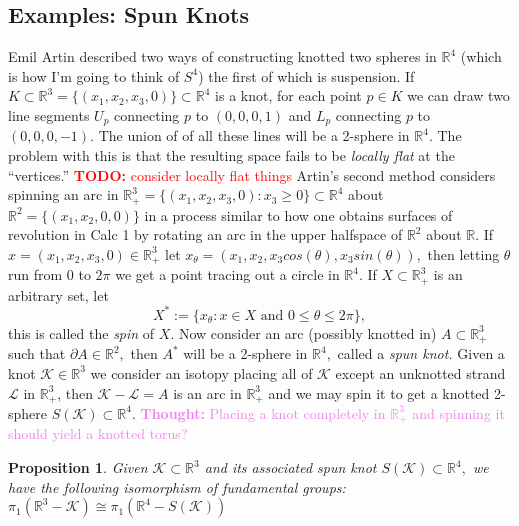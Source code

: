 \documentclass{amsart}
\def\todo#1{\textcolor{red}{\textbf{TODO: }{#1}}}
\def\thought#1{\textcolor{violet}{\textbf{Thought: }{#1}}}
\newtheorem{proposition}[theorem]{Proposition}
\theoremstyle{definition}
\begin{document}
\subsection{Examples: Spun Knots}
Emil Artin described two ways of constructing knotted two spheres in $\mathbb{R}^{4}$ (which is how I'm going to think of $S^{4}$) the first of which is suspension. If $K \subset \mathbb{R}^{3} = \{(x_{1}, x_{2}, x_{3}, 0)\}\subset \mathbb{R}^{4}$ is a knot, for each point $p \in K$ we can draw two line segments $U_{p}$ connecting $p$ to $(0, 0, 0, 1)$ and $L_{p}$ connecting $p$ to $(0, 0, 0, -1).$ The union of of all these lines will be a 2-sphere in $\mathbb{R}^{4}.$ The problem with this is that the resulting space fails to be \textit{locally flat} at the ``vertices.'' \todo{consider locally flat things} \newline \newline Artin's second method considers spinning an arc in $\mathbb{R}^{3}_{+} = \{(x_{1}, x_{2}, x_{3}, 0) : x_{3} \geq 0\} \subset \mathbb{R}^{4}$ about $\mathbb{R}^{2} = \{(x_{1}, x_{2}, 0, 0)\}$ in a process similar to how one obtains surfaces of revolution in Calc 1 by rotating an arc in the upper halfspace of $\mathbb{R}^{2}$ about $\mathbb{R}$. If $x = (x_{1}, x_{2}, x_{3}, 0) \in \mathbb{R}^{3}_{+}$ let $x_{\theta} = (x_{1}, x_{2}, x_{3}cos(\theta), x_{3}sin(\theta)),$ then letting $\theta$ run from 0 to $2\pi$ we get a point tracing out a circle in $\mathbb{R}^{4}.$ If $X \subset \mathbb{R}^{3}_{+}$ is an arbitrary set, let $$X^{*} := \{x_{\theta}: x \in X \text{ and } 0 \leq \theta \leq 2\pi\},$$ this is called the \textit{spin} of $X.$ Now consider an arc (possibly knotted in) $A \subset \mathbb{R}^{3}_{+}$ such that $\partial A \in \mathbb{R}^{2},$ then $A^{*}$ will be a 2-sphere in $\mathbb{R}^{4},$ called a \textit{spun knot.} \newline \newline Given a knot $\mathcal{K} \in \mathbb{R}^{3}$ we consider an isotopy placing all of $\mathcal{K}$ except an unknotted strand $\mathcal{L}$ in $\mathbb{R}^{3}_{+}$, then $\mathcal{K} - \mathcal{L} = A$ is an arc in  $\mathbb{R}^{3}_{+}$ and we may spin it to get a knotted 2-sphere $S(\mathcal{K})  \subset \mathbb{R}^{4}.$
\thought{Placing a knot completely in $\mathbb{R}^{3}_{+}$ and spinning it should yield a knotted torus?}
\begin{proposition} Given $\mathcal{K} \subset \mathbb{R}^{3}$ and its associated spun knot $S(\mathcal{K}) \subset \mathbb{R}^{4},$ we have the following isomorphism of fundamental groups: $\pi_{1}(\mathbb{R}^{3} - \mathcal{K}) \cong \pi_{1}(\mathbb{R}^{4} - S(\mathcal{K})) $
\end{proposition}
\end{document}
